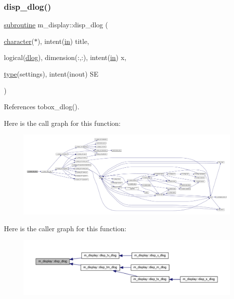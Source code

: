 \subsubsection{\texorpdfstring{disp\+\_\+dlog()}{disp\_dlog()}}
{\footnotesize\ttfamily \hyperlink{M__stopwatch_83_8txt_acfbcff50169d691ff02d4a123ed70482}{subroutine} m\+\_\+display\+::disp\+\_\+dlog (\begin{DoxyParamCaption}\item[{\hyperlink{option__stopwatch_83_8txt_abd4b21fbbd175834027b5224bfe97e66}{character}($\ast$), intent(\hyperlink{M__journal_83_8txt_afce72651d1eed785a2132bee863b2f38}{in})}]{title,  }\item[{logical(\hyperlink{namespacem__display_a8c6a3df510feabf6bc84dd0a8789f98c}{dlog}), dimension(\+:,\+:), intent(\hyperlink{M__journal_83_8txt_afce72651d1eed785a2132bee863b2f38}{in})}]{x,  }\item[{\hyperlink{stop__watch_83_8txt_a70f0ead91c32e25323c03265aa302c1c}{type}(settings), intent(inout)}]{SE }\end{DoxyParamCaption})\hspace{0.3cm}{\ttfamily [private]}}



References tobox\+\_\+dlog().

Here is the call graph for this function\+:
\nopagebreak
\begin{figure}[H]
\begin{center}
\leavevmode
\includegraphics[width=350pt]{namespacem__display_ac6960db2f07da55b2c8a72f30531ed97_cgraph}
\end{center}
\end{figure}
Here is the caller graph for this function\+:
\nopagebreak
\begin{figure}[H]
\begin{center}
\leavevmode
\includegraphics[width=350pt]{namespacem__display_ac6960db2f07da55b2c8a72f30531ed97_icgraph}
\end{center}
\end{figure}
\mbox{\label{namespacem__display_a6a49f987c37a95e67744950ecee69530}} 
